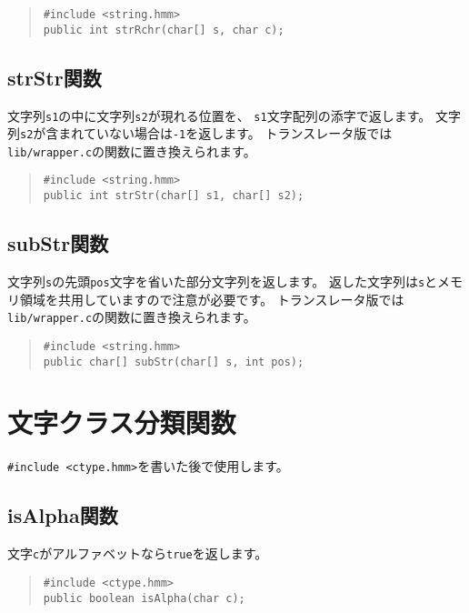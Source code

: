 \begin{quote}
\begin{verbatim}
#include <string.hmm>
public int strRchr(char[] s, char c);
\end{verbatim}
\end{quote}

\subsection{strStr関数}

文字列\verb/s1/の中に文字列\verb/s2/が現れる位置を、
\verb/s1/文字配列の添字で返します。
文字列\verb/s2/が含まれていない場合は\verb/-1/を返します。
トランスレータ版では\verb;lib/wrapper.c;の関数に置き換えられます。

\begin{quote}
\begin{verbatim}
#include <string.hmm>
public int strStr(char[] s1, char[] s2);
\end{verbatim}
\end{quote}

\subsection{subStr関数}

文字列\verb/s/の先頭\verb/pos/文字を省いた部分文字列を返します。
返した文字列は\verb/s/とメモリ領域を共用していますので注意が必要です。
トランスレータ版では\verb;lib/wrapper.c;の関数に置き換えられます。

\begin{quote}
\begin{verbatim}
#include <string.hmm>
public char[] subStr(char[] s, int pos);
\end{verbatim}
\end{quote}

\section{文字クラス分類関数}

\verb/#include <ctype.hmm>/を書いた後で使用します。

\subsection{isAlpha関数}

文字\verb/c/がアルファベットなら\verb/true/を返します。

\begin{quote}
\begin{verbatim}
#include <ctype.hmm>
public boolean isAlpha(char c);
\end{verbatim}
\end{quote}

